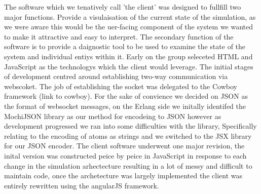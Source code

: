 The software which we tenatively call 'the client' was designed to fullfill two major functions.
Provide a visulaisation of the current state of the simulation, as we were aware this would be the uer-facing component of the system we wanted to make it attractive and easy to interpret.
The secondary function of the software is to provide a daignostic tool to be used to examine the state of the system and individual entiys within it.
Early on the group seleceted HTML and JavaScript as the technologys which the client would leverage. The initial stages of development centred around establishing two-way communication via webscoket. The job of establishing the socket was delegated to the Cowboy framework (link to cowboy). For the sake of convience we decided on JSON as the format of websocket messages, on the Erlang side we initally identifed the MochiJSON library as our method for encodeing to JSON however as development progressed we ran into some difficulties with the library, Specifically relating to the encoding of atoms as strings and we switched to the JSX library for our JSON encoder.
The client software underwent one major revision, the inital version was constructed peice by peice in JavaScript in response to each change in the simulation arhectecture resulting in a lot of messy and difficult to maintain code, once the archetecture was largely implemented the client was entirely rewritten using the angularJS framework.

